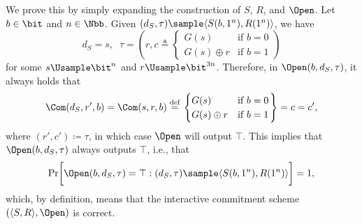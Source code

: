 \begin{answer}[a]
    We prove this by simply expanding the construction of $S$, $R$, and $\Open$.
    Let $b\in\bit$ and $n\in\Nbb$.
    Given $(d_S, \tau)\sample \langle S(b,1^n), R(1^n)\rangle$, we have 
    \[
        d_S =s,\;\; \tau=\left(r, c\triangleq \begin{cases}
            G(s) &\textrm{if } b=0\\
            G(s)\oplus r &\textrm{if } b=1
        \end{cases} \right)
    \]
    for some $s\Usample\bit^n$ and $r\Usample\bit^{3n}$.
    Therefore, in $\Open(b, d_S,\tau)$, it always holds that
    \[
        \Com(d_S,r',b)= \Com(s,r,b) \stackrel{\textrm{def}}=  \left.\begin{cases}
            G(s) &\textrm{if } b=0\\
            G(s)\oplus r &\textrm{if } b=1
        \end{cases} \right\}
        = c = c',
    \]
    where $(r',c')\coloneqq \tau$, in which case $\Open$ will output $\top$. This implies that $\Open(b, d_S,\tau)$ always outputs $\top$, i.e., that
    \[
        \Pr\biggl[\Open(b, d_S,\tau)=\top :  (d_S, \tau)\sample \langle S(b,1^n), R(1^n)\rangle \biggr] = 1,
    \]
    which, by definition, means that the interactive commitment scheme $(\langle S, R\rangle, \Open)$ is correct.
\end{answer}





